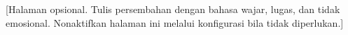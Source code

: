 
\vfill

\begin{flushright}
  \begin{minipage}{0.72\textwidth}
    [Halaman opsional. Tulis persembahan dengan bahasa wajar, lugas, dan tidak
    emosional. Nonaktifkan halaman ini melalui konfigurasi bila tidak diperlukan.]
  \end{minipage}
\end{flushright}

\vfill
